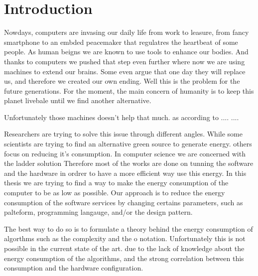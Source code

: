 \newpage
\chapter{Introduction}
\label{chapter:introduction}

Nowdays, computers are invasing our daily life from work to leasure, from fancy smartphone to an embded peacemaker that regulatres the heartbeat of some people. As human beigns we are known to use tools to enhance our bodies. And thanks to computers we pushed that step even further where now we are using machines to extend our brains. Some even argue that one day they will replace us, and therefore we created our own ending. Well this is the problem for the future generations. For the moment, the main concern of humanity is to keep this planet livebale until we find another alternative.

Unfortunately those machines doesn't help that much. as according to .... ....


Researchers are trying to solve this issue through different angles.
While some scientists are trying to find an alternative green source to generate energy. others focus on reducing it's%
consumption. In computer science we are concerned with the ladder solution %
Therefore most of the works are done on tunning the software and the hardware in ordrer to have a more efficient way use this energy. %
In this thesis we are trying to find a way to make the energy consumption of the computer to be as low as possible. %
Our approach is to reduce the energy consumption of the software services by changing certains parameters, such as palteform, programming langauge, and/or the design pattern.

The best way to do so is to formulate a theory behind the energy consumption of algorthms such as the complexity and the o notation.
Unfortunately this is not possible in the current state of the art. due to the lack of knowledge about the energy consumption of the algorithms, and the strong correlation between this consumption and the hardware configuration.


